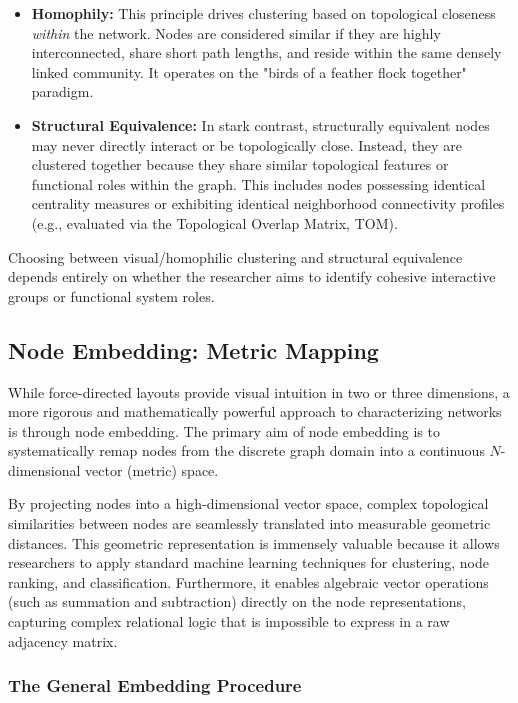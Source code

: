\begin{itemize}
    \item \textbf{Homophily:} This principle drives clustering based on topological closeness \textit{within} the network. Nodes are considered similar if they are highly interconnected, share short path lengths, and reside within the same densely linked community. It operates on the "birds of a feather flock together" paradigm.
    \item \textbf{Structural Equivalence:} In stark contrast, structurally equivalent nodes may never directly interact or be topologically close. Instead, they are clustered together because they share similar topological features or functional roles within the graph. This includes nodes possessing identical centrality measures or exhibiting identical neighborhood connectivity profiles (e.g., evaluated via the Topological Overlap Matrix, TOM).
\end{itemize}

Choosing between visual/homophilic clustering and structural equivalence depends entirely on whether the researcher aims to identify cohesive interactive groups or functional system roles.

\subsection{Node Embedding: Metric Mapping}
\label{subsec:node_embedding}

While force-directed layouts provide visual intuition in two or three dimensions, a more rigorous and mathematically powerful approach to characterizing networks is through node embedding. The primary aim of node embedding is to systematically remap nodes from the discrete graph domain into a continuous $N$-dimensional vector (metric) space.

By projecting nodes into a high-dimensional vector space, complex topological similarities between nodes are seamlessly translated into measurable geometric distances. This geometric representation is immensely valuable because it allows researchers to apply standard machine learning techniques for clustering, node ranking, and classification. Furthermore, it enables algebraic vector operations (such as summation and subtraction) directly on the node representations, capturing complex relational logic that is impossible to express in a raw adjacency matrix.

\subsubsection{The General Embedding Procedure}
\label{subsubsec:embedding_procedure}

